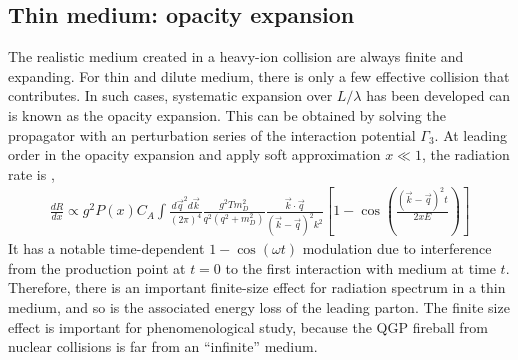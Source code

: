 \subsection{Thin medium: opacity expansion}
The realistic medium created in a heavy-ion collision are always finite and expanding.
For thin and dilute medium, there is only a few effective collision that contributes.
In such cases, systematic expansion over $L/\lambda$ has been developed can is known as the opacity expansion.
This can be obtained by solving the propagator with an perturbation series of the interaction potential $\Gamma_3$.
At leading order in the opacity expansion and apply soft approximation $x\ll 1$, the radiation rate is \cite{Djordjevic:2008iz},
\begin{eqnarray}
\frac{dR}{dx} \propto g^2 P(x) C_A \int \frac{d\vec{q}^2 d\vec{k}}{(2\pi)^4} \frac{g^2 T m_D^2}{q^2(q^2 + m_D^2)} \frac{\vec{k}\cdot\vec{q}}{(\vec{k}-\vec{q})^2 k^2} \left[1-\cos\left(\frac{(\vec{k}-\vec{q})^2 t}{2x E}\right)\right]
\end{eqnarray}
It has a notable time-dependent $1-\cos(\omega t)$ modulation due to interference from the production point at $t=0$ to the first interaction with medium at time $t$.
Therefore, there is an important finite-size effect for radiation spectrum in a thin medium, and so is the associated energy loss of the leading parton.
The finite size effect is important for phenomenological study, because the QGP fireball from nuclear collisions is far from an ``infinite'' medium.

